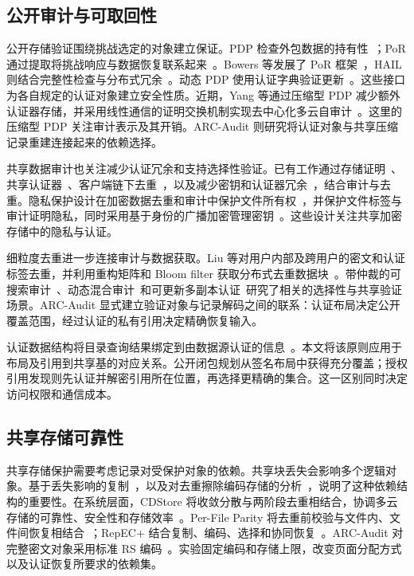 \documentclass[10pt,journal]{IEEEtran}
\begin{document}
\subsection{公开审计与可取回性}
公开存储验证围绕挑战选定的对象建立保证。PDP 检查外包数据的持有性~\cite{Ateniese2007PDP}；PoR 通过提取将挑战响应与数据恢复联系起来~\cite{Juels2007POR,ShachamWaters2013}。Bowers 等发展了 PoR 框架~\cite{Bowers2009PORTheory}，HAIL 则结合完整性检查与分布式冗余~\cite{Bowers2009HAIL}。动态 PDP 使用认证字典验证更新~\cite{Erway2009DPDP}。这些接口为各自规定的认证对象建立安全性质。近期，Yang 等通过压缩型 PDP 减少额外认证器存储，并采用线性通信的证明交换机制实现去中心化多云自审计~\cite{Yang2025CompressedPDP}。这里的压缩型 PDP 关注审计表示及其开销。ARC-Audit 则研究将认证对象与共享压缩记录重建连接起来的依赖选择。

共享数据审计也关注减少认证冗余和支持选择性验证。已有工作通过存储证明~\cite{Zheng2012POSD}、共享认证器~\cite{Tian2022SharedAudit}、客户端链下去重~\cite{Zhang2023BlockchainAudit}，以及减少密钥和认证器冗余~\cite{Miao2024SharedAudit}，结合审计与去重。隐私保护设计在加密数据去重和审计中保护文件所有权~\cite{Song2023EncryptedAudit}，并保护文件标签与审计证明隐私，同时采用基于身份的广播加密管理密钥~\cite{Zhang2025PrivacyAudit}。这些设计关注共享加密存储中的隐私与认证。

细粒度去重进一步连接审计与数据获取。Liu 等对用户内部及跨用户的密文和认证标签去重，并利用重构矩阵和 Bloom filter 获取分布式去重数据块~\cite{Liu2025FineGrained}。带仲裁的可搜索审计~\cite{Miao2025}、动态混合审计~\cite{Pan2026}和可更新多副本认证~\cite{Xu2026MPA}研究了相关的选择性与共享验证场景。ARC-Audit 显式建立验证对象与记录解码之间的联系：认证布局决定公开覆盖范围，经过认证的私有引用决定精确恢复输入。

认证数据结构将目录查询结果绑定到由数据源认证的信息~\cite{Goodrich2003ADS}。本文将该原则应用于布局及引用到共享基的对应关系。公开闭包规划从签名布局中获得充分覆盖；授权引用发现则先认证并解密引用所在位置，再选择更精确的集合。这一区别同时决定访问权限和通信成本。

\subsection{共享存储可靠性}
共享存储保护需要考虑记录对受保护对象的依赖。共享块丢失会影响多个逻辑对象。基于丢失影响的复制~\cite{Bhagwat2006Reliability}，以及对去重擦除编码存储的分析~\cite{Li2010Reliability}，说明了这种依赖结构的重要性。在系统层面，CDStore 将收敛分散与两阶段去重相结合，协调多云存储的可靠性、安全性和存储效率~\cite{Li2015CDStore}。Per-File Parity 将去重前校验与文件内、文件间恢复相结合~\cite{Wu2019PFP}；RepEC+ 结合复制、编码、选择和协同恢复~\cite{Zuo2022RepECPlus}。ARC-Audit 对完整密文对象采用标准 RS 编码~\cite{ReedSolomon1960}。实验固定编码和存储上限，改变页面分配方式以及认证恢复所要求的依赖集。
\end{document}
